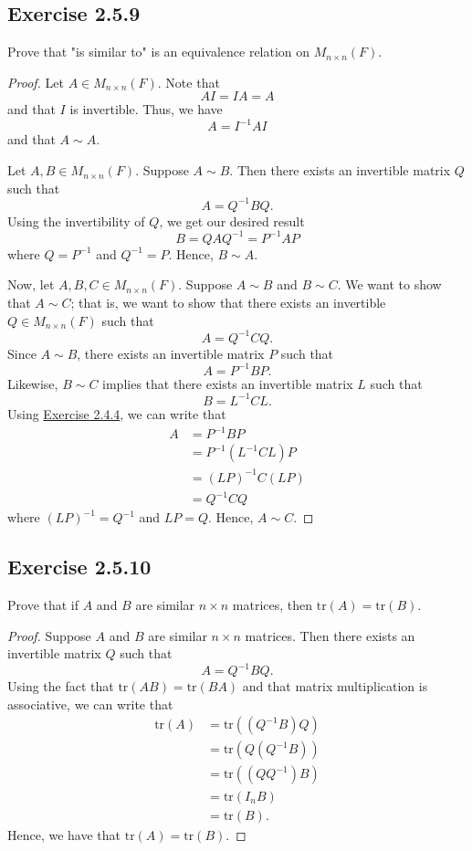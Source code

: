 \subsection*{Exercise 2.5.9} Prove that "is similar to" is an equivalence relation on \( {M}_{n \times n }(F) \).
\begin{proof}
Let \( A \in {M}_{n \times n }(F)  \). Note that
\[  AI = IA = A  \] and that \( I   \) is invertible. Thus, we have
\[  A = I^{-1} A I \]
and that \( A \sim A  \). 

Let \( A, B \in {M}_{n \times n }(F) \). Suppose \( A \sim B  \). Then there exists an invertible matrix \( Q  \) such that 
\[  A = Q^{-1} B Q. \] Using the invertibility of \( Q  \), we get our desired result
\[  B = Q A Q^{-1} = P^{-1} A P  \]
where \( Q = P^{-1} \) and \( Q^{-1} = P  \). Hence, \( B \sim A  \).

Now, let \( A, B , C \in {M}_{n \times n}(F) \). Suppose \( A \sim B  \) and \( B \sim C  \). We want to show that \( A  \sim C  \); that is, we want to show that there exists an invertible \( Q \in {M}_{n \times n}(F)  \) such that
\[ A = Q^{-1} C Q.   \]
Since \( A \sim B  \), there exists an invertible matrix \( P  \) such that
\[ A = P^{-1} B P.   \]
Likewise, \( B \sim C  \) implies that there exists an invertible matrix \( L  \) such that
\[  B = L^{-1} C L. \]
Using {\hyperref[Exercise 2.4.4]{Exercise 2.4.4}}, we can write that
\begin{align*}
    A &= P^{-1} B P  \\
      &= P^{-1} (L^{-1} C L) P \\ 
      &= (LP)^{-1} C (LP) \\
      &= Q^{-1} C Q
\end{align*}
where \( (LP)^{-1} = Q^{-1} \) and \( LP = Q  \). Hence, \( A \sim C  \).
\end{proof}

\subsection*{Exercise 2.5.10} Prove that if \( A  \) and \( B  \) are similar \( n \times n  \) matrices, then \( \text{tr}(A) = \text{tr}(B) \).
\begin{proof}
    Suppose \( A  \) and \( B  \) are similar \( n \times n \) matrices. Then there exists an invertible matrix \( Q  \) such that
    \[  A = Q^{-1} B Q. \]
    Using the fact that \( \text{tr}(AB) = \text{tr}(BA) \) and that matrix multiplication is associative, we can write that
    \begin{align*}
        \text{tr}(A) &= \text{tr}((Q^{-1}B) Q) \\
                     &= \text{tr}(Q (Q^{-1}B)) \\
                     &= \text{tr}((Q Q^{-1})B) \\ 
                     &= \text{tr}({I}_{n}B ) \\
                     &=  \text{tr}(B). 
    \end{align*}
    Hence, we have that \( \text{tr}(A ) = \text{tr}(B) \).
\end{proof}

